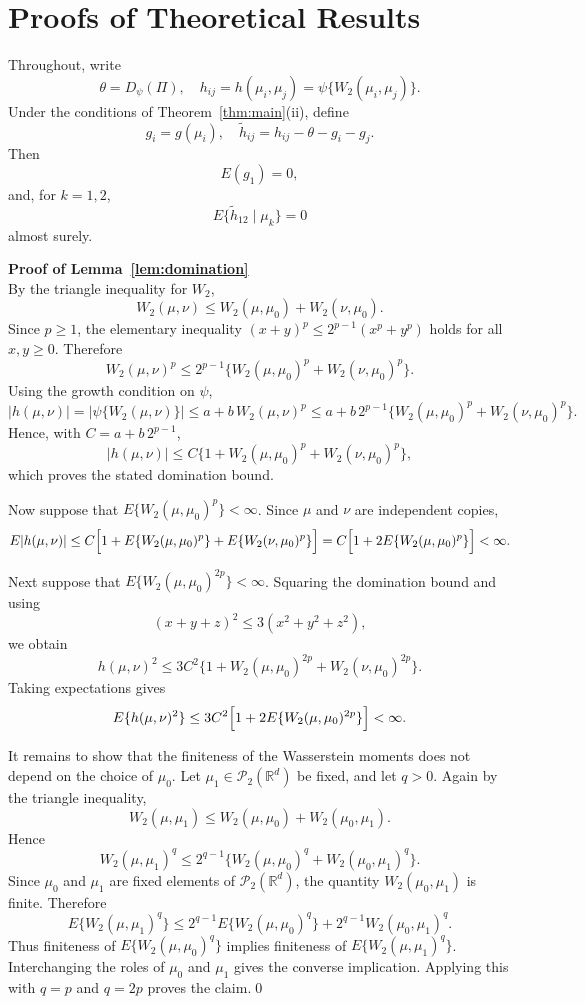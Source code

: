 \documentclass[10pt]{article}
\newcommand{\R}{\mathbb{R}}
\newcommand{\Ptwo}{\mathcal{P}_2(\R^d)}
\newcommand{\W}{W_2}
\begin{document}



\newpage 
\appendix
\section*{Proofs of Theoretical Results}

Throughout, write
\[
\theta = D_{\psi}(\Pi),\quad h_{ij}=h(\mu_i,\mu_j)=\psi\{\W(\mu_i,\mu_j)\}.
\]
Under the conditions of Theorem~\ref{thm:main}(ii), define
\[
g_i=g(\mu_i),\quad
\widetilde h_{ij}=h_{ij}-\theta-g_i-g_j.
\]
Then
\[
E(g_1)=0,
\]
and, for $k=1,2$,
\[
E\{\widetilde h_{12}\mid \mu_k\}=0
\]
almost surely.

\vspace{1cm}
\noindent \textbf{Proof of Lemma~\ref{lem:domination}}\\
By the triangle inequality for $\W$,
\[
\W(\mu,\nu)\leq \W(\mu,\mu_0)+\W(\nu,\mu_0).
\]
Since $p\geq 1$, the elementary inequality $(x+y)^p\leq 2^{p-1}(x^p+y^p)$ holds for all $x,y\geq 0$. Therefore
\[
\W(\mu,\nu)^p
\leq 2^{p-1}\bigl\{\W(\mu,\mu_0)^p+\W(\nu,\mu_0)^p\bigr\}.
\]
Using the growth condition on $\psi$,
\[
|h(\mu,\nu)|
=
\bigl|\psi\{\W(\mu,\nu)\}\bigr|
\leq
a+b\,\W(\mu,\nu)^p
\leq
a+b\,2^{p-1}\bigl\{\W(\mu,\mu_0)^p+\W(\nu,\mu_0)^p\bigr\}.
\]
Hence, with $C=a+b\,2^{p-1}$,
\[
|h(\mu,\nu)|
\leq
C\bigl\{1+\W(\mu,\mu_0)^p+\W(\nu,\mu_0)^p\bigr\},
\]
which proves the stated domination bound.

Now suppose that $E\{\W(\mu,\mu_0)^p\}<\infty$. Since $\mu$ and $\nu$ are independent copies,
\[
E|h(\mu,\nu)|
\leq
C\Bigl[1+E\{\W(\mu,\mu_0)^p\}+E\{\W(\nu,\mu_0)^p\}\Bigr]
=
C\Bigl[1+2E\{\W(\mu,\mu_0)^p\}\Bigr]
<\infty.
\]

Next suppose that $E\{\W(\mu,\mu_0)^{2p}\}<\infty$. Squaring the domination bound and using
\[
(x+y+z)^2\leq 3(x^2+y^2+z^2),
\]
we obtain
\[
h(\mu,\nu)^2
\leq
3C^2\bigl\{1+\W(\mu,\mu_0)^{2p}+\W(\nu,\mu_0)^{2p}\bigr\}.
\]
Taking expectations gives
\[
E\{h(\mu,\nu)^2\}
\leq
3C^2\Bigl[1+2E\{\W(\mu,\mu_0)^{2p}\}\Bigr]
<\infty.
\]

It remains to show that the finiteness of the Wasserstein moments does not depend on the choice of $\mu_0$. Let $\mu_1\in\Ptwo$ be fixed, and let $q>0$. Again by the triangle inequality,
\[
\W(\mu,\mu_1)\leq \W(\mu,\mu_0)+\W(\mu_0,\mu_1).
\]
Hence
\[
\W(\mu,\mu_1)^q
\leq
2^{q-1}\bigl\{\W(\mu,\mu_0)^q+\W(\mu_0,\mu_1)^q\bigr\}.
\]
Since $\mu_0$ and $\mu_1$ are fixed elements of $\Ptwo$, the quantity $\W(\mu_0,\mu_1)$ is finite. Therefore
\[
E\{\W(\mu,\mu_1)^q\}
\leq
2^{q-1}E\{\W(\mu,\mu_0)^q\}
+
2^{q-1}\W(\mu_0,\mu_1)^q.
\]
Thus finiteness of $E\{\W(\mu,\mu_0)^q\}$ implies finiteness of $E\{\W(\mu,\mu_1)^q\}$. Interchanging the roles of $\mu_0$ and $\mu_1$ gives the converse implication. Applying this with $q=p$ and $q=2p$ proves the claim.\qed 
\end{document}
